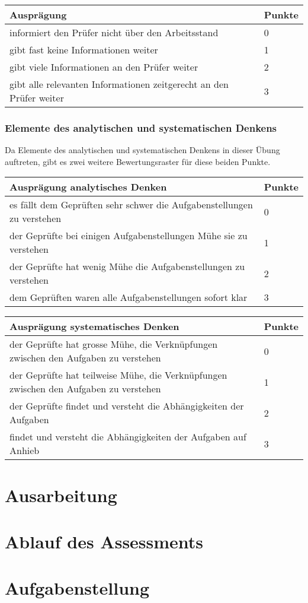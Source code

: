 \begin{center}
  \begin{tabular}{ | p{7cm} | p{1cm} |}
   \hline
   \textbf{Ausprägung} & \textbf{Punkte} \\ \hline
   informiert den Prüfer nicht über den Arbeitsstand & 0 \\ \hline
   gibt fast keine Informationen weiter & 1 \\ \hline
   gibt viele Informationen an den Prüfer weiter & 2 \\ \hline
   gibt alle relevanten Informationen zeitgerecht an den Prüfer weiter & 3\\ \hline
  \end{tabular}
\end{center}

\subsubsection{Elemente des analytischen und systematischen Denkens}
Da Elemente des analytischen und systematischen Denkens in dieser Übung auftreten, gibt es zwei weitere Bewertungsraster für diese beiden Punkte.

\begin{center}
  \begin{tabular}{ | p{11cm} | p{1cm} |}
   \hline
   \textbf{Ausprägung analytisches Denken} & \textbf{Punkte} \\ \hline
   es fällt dem Geprüften sehr schwer die Aufgabenstellungen zu verstehen & 0 \\ \hline
   der Geprüfte bei einigen Aufgabenstellungen Mühe sie zu verstehen  & 1 \\ \hline
   der Geprüfte hat wenig Mühe die Aufgabenstellungen zu verstehen & 2 \\ \hline
   dem Geprüften waren alle Aufgabenstellungen sofort klar & 3\\ \hline
  \end{tabular}
\end{center}

\begin{center}
  \begin{tabular}{ | p{11cm} | p{1cm} |}
   \hline
   \textbf{Ausprägung systematisches Denken} & \textbf{Punkte} \\ \hline
   der Geprüfte hat grosse Mühe, die Verknüpfungen zwischen den Aufgaben zu verstehen & 0 \\ \hline
    der Geprüfte hat teilweise Mühe, die Verknüpfungen zwischen den Aufgaben zu verstehen & 1 \\ \hline
   der Geprüfte findet und versteht die Abhängigkeiten der Aufgaben & 2 \\ \hline
   findet und versteht die Abhängigkeiten der Aufgaben auf Anhieb & 3\\ \hline
  \end{tabular}
\end{center}

\section{Ausarbeitung}

\section{Ablauf des Assessments}

\section{Aufgabenstellung}